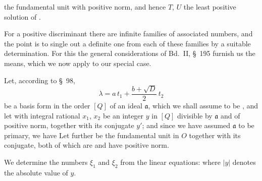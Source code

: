 
the fundamental unit with positive norm, and hence $T$, $U$ the
least positive solution of
.

For a positive discriminant there are infinite families of associated
numbers, and the point is to single out a definite one from each of
these families by a suitable determination. For this the general
considerations of Bd.~II, \S\ 195 furnish us the means, which we now
apply to our special case.

Let, according to \S\ 98,
\[
\lambda = a\, t_1 + \frac{b+\sqrt{D}}{2}\, t_2
\]
be a basis form in the order $[Q]$ of an ideal $\mathfrak{a}$, which we
shall assume to be , and let
with integral rational $x_1$, $x_2$ be an integer $y$ in $[Q]$
divisible by $\mathfrak{a}$ and of positive norm, together with its
conjugate $y'$; and since we have assumed $\mathfrak{a}$ to be primary,
we have
Let further
be the fundamental unit in $O$ together with its conjugate, both of
which are  and have positive norm.

We determine the numbers $\xi_1$ and $\xi_2$ from the linear
equations:
where $|y|$ denotes the absolute value of $y$.
